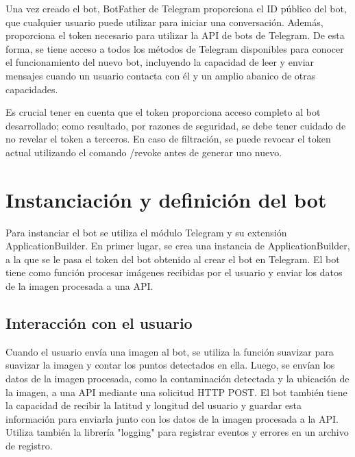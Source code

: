 Una vez creado el bot, BotFather de Telegram proporciona el ID público del bot, que cualquier usuario puede utilizar para iniciar una conversación. Además, proporciona el token necesario para utilizar la API de bots de Telegram. De esta forma, se tiene acceso a todos los métodos de Telegram disponibles para conocer el funcionamiento del nuevo bot, incluyendo la capacidad de leer y enviar mensajes cuando un usuario contacta con él y un amplio abanico de otras capacidades.

Es crucial tener en cuenta que el token proporciona acceso completo al bot desarrollado; como resultado, por razones de seguridad, se debe tener cuidado de no revelar el token a terceros. En caso de filtración, se puede revocar el token actual utilizando el comando /revoke antes de generar uno nuevo.

\section{Instanciación y definición del bot}


Para instanciar el bot se utiliza el módulo Telegram y su extensión ApplicationBuilder. En primer lugar, se crea una instancia de ApplicationBuilder, a la que se le pasa el token del bot obtenido al crear el bot en Telegram.
El bot tiene como función procesar imágenes recibidas por el usuario y enviar los datos de la imagen procesada a una API. 
\subsection{Interacción con el usuario}
Cuando el usuario envía una imagen al bot, se utiliza la función suavizar para suavizar la imagen y contar los puntos detectados en ella. Luego, se envían los datos de la imagen procesada, como la contaminación detectada y la ubicación de la imagen, a una API mediante una solicitud HTTP POST. El bot también tiene la capacidad de recibir la latitud y longitud del usuario y guardar esta información para enviarla junto con los datos de la imagen procesada a la API. Utiliza también la librería "logging" para registrar eventos y errores en un archivo de registro.
